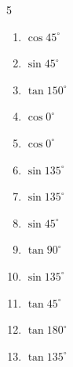 \begin{multicols}{5}
\begin{enumerate}
  \item $\displaystyle \cos{45^\circ}$


  \item $\displaystyle \sin{45^\circ}$


  \item $\displaystyle \tan{150^\circ}$


  \item $\displaystyle \cos{0^\circ}$

        \phantom{$\displaystyle =1$}

  \item $\displaystyle \cos{0^\circ}$

        \phantom{$\displaystyle =1$}

  \item $\displaystyle \sin{135^\circ}$


  \item $\displaystyle \sin{135^\circ}$


  \item $\displaystyle \sin{45^\circ}$


  \item $\displaystyle \tan{90^\circ}$

        \phantom{$\displaystyle なし$}

  \item $\displaystyle \sin{135^\circ}$


  \item $\displaystyle \tan{45^\circ}$

        \phantom{$\displaystyle =1$}

  \item $\displaystyle \tan{180^\circ}$

        \phantom{$\displaystyle =0$}

  \item $\displaystyle \tan{135^\circ}$


\end{enumerate}
\end{multicols}
